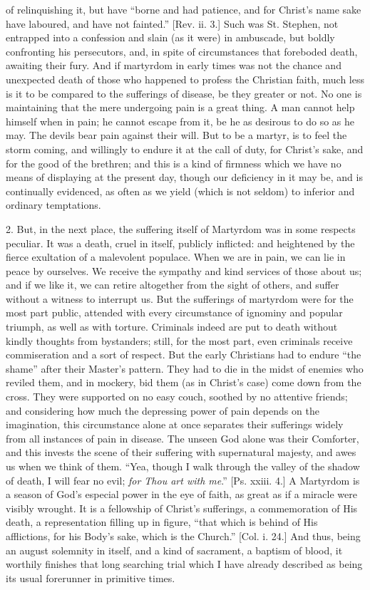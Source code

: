 of relinquishing it, but have ``borne and had patience, and for
Christ's name sake have laboured, and have not fainted.'' [Rev.
ii. 3.] Such was St. Stephen, not entrapped into a confession and
slain (as it were) in ambuscade, but boldly confronting his
persecutors, and, in spite of circumstances that foreboded death,
awaiting their fury. And if martyrdom in early times was not the
chance and unexpected death of those who happened to profess the
Christian faith, much less is it to be compared to the sufferings of
disease, be they greater or not. No one is maintaining that the mere
undergoing pain is a great thing. A man cannot help himself when in
pain; he cannot escape from it, be he as desirous to do so as he may.
The devils bear pain against their will. But to be a martyr, is to
feel the storm coming, and willingly to endure it at the call of duty,
for Christ's sake, and for the good of the brethren; and this is a
kind of firmness which we have no means of displaying at the present
day, though our deficiency in it may be, and is continually evidenced,
as often as we yield (which is not seldom) to inferior and ordinary
temptations.

2. But, in the next place, the suffering itself of Martyrdom was in
some respects peculiar. It was a death, cruel in itself, publicly
inflicted: and heightened by the fierce exultation of a malevolent
populace. When we are in pain, we can lie in peace by ourselves. We
receive the sympathy and kind services of those about us; and if we
like it, we can retire altogether from the sight of others, and suffer
without a witness to interrupt us. But the sufferings of martyrdom
were for the most part public, attended with every circumstance of
ignominy and popular triumph, as well as with torture. Criminals
indeed are put to death without kindly thoughts from bystanders;
still, for the most part, even criminals receive commiseration and a
sort of respect. But the early Christians had to endure ``the
shame'' after their Master's pattern. They had to die in the midst
of enemies who reviled them, and in mockery, bid them (as in Christ's
case) come down from the cross. They were supported on no easy couch,
soothed by no attentive friends; and considering how much the
depressing power of pain depends on the imagination, this circumstance
alone at once separates their sufferings widely from all instances of
pain in disease. The unseen God alone was their Comforter, and this
invests the scene of their suffering with supernatural majesty, and
awes us when we think of them. ``Yea, though I walk through the
valley of the shadow of death, I will fear no evil; \emph{for Thou art
with me}.'' [Ps. xxiii. 4.] A Martyrdom is a season of God's
especial power in the eye of faith, as great as if a miracle were
visibly wrought. It is a fellowship of Christ's sufferings, a
commemoration of His death, a representation filling up in figure,
``that which is behind of His afflictions, for his Body's sake,
which is the Church.'' [Col. i. 24.] And thus, being an august
solemnity in itself, and a kind of sacrament, a baptism of blood, it
worthily finishes that long searching trial which I have already
described as being its usual forerunner in primitive times.

